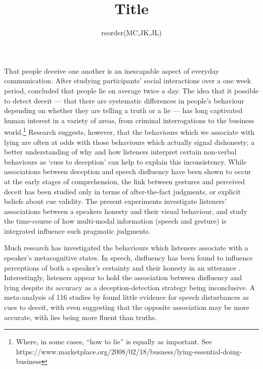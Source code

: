 \documentclass[a4paper,man,natbib]{apa6}
\title{Title}
\author{reorder(MC,JK,JL)}
\affiliation{Psychology, PPLS, University of Edinburgh}
\begin{document}
\maketitle

\noindent
That people deceive one another is an inescapable aspect of everyday communication.
After studying participants' social interactions over a one week period, \citet{DePaulo1996} concluded that people lie on average twice a day.
The idea that it possible to detect deceit --- that there are systematic differences in people's behaviour depending on whether they are telling a truth or a lie --- has long captivated human interest in a variety of areas, from criminal interrogations to the business world.\footnote{Where, in some cases, ``how to lie'' is equally as important. See https://www.marketplace.org/2008/02/18/busness/lying-essential-doing-business}
Research suggests, however, that the behaviours which we associate with lying are often at odds with those behaviours which actually signal dishonesty; a better understanding of why and how listeners interpret certain non-verbal behaviours as `cues to deception' can help to explain this inconsistency.
While associations between deception and speech disfluency have been shown to occur at the early stages of comprehension, the link between gestures and perceived deceit has been studied only in terms of after-the-fact judgments, or explicit beliefs about cue validity.
The present experiments investigate listeners' associations between a speakers honesty and their visual behaviour, and study the time-course of how multi-modal information (speech and gesture) is integrated influence such pragmatic judgments.

Much research has investigated the behaviours which listeners associate with a speaker's metacognitive states.
In speech, disfluency has been found to influence perceptions of both a speaker's certainty \citep{Swerts2005} and their honesty in an utterance \citep{Zuckerman1981, Loy2017}.
Interestingly, listeners appear to hold the association between disfluency and lying despite its accuracy as a deception-detection strategy being inconclusive.
A \citeyear{DePaulo2003} meta-analysis of 116 studies by \citeauthor{DePaulo2003} found little evidence for speech disturbances as cues to deceit, with \citet{Arciuli2009} even suggesting that the opposite association may be more accurate, with lies being more fluent than truths.
\end{document}
